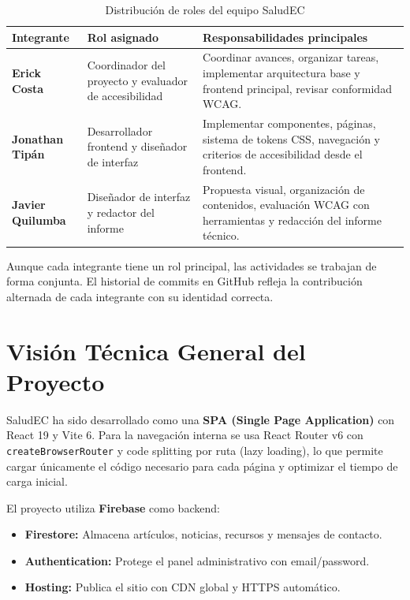 \documentclass[12pt, a4paper]{article}
\begin{document}
\begin{table}[H]
\centering
\caption{Distribución de roles del equipo SaludEC}
\begin{tabular}{@{}>{\bfseries}p{3.5cm} p{4cm} p{6.5cm}@{}}
\toprule
\rowcolor{royalblue!12}
\textbf{Integrante} & \textbf{Rol asignado} & \textbf{Responsabilidades principales} \\
\midrule
Erick Costa &
  Coordinador del proyecto y evaluador de accesibilidad &
  Coordinar avances, organizar tareas, implementar arquitectura base y frontend principal, revisar conformidad WCAG. \\[4pt]
Jonathan Tipán &
  Desarrollador frontend y diseñador de interfaz &
  Implementar componentes, páginas, sistema de tokens CSS, navegación y criterios de accesibilidad desde el frontend. \\[4pt]
Javier Quilumba &
  Diseñador de interfaz y redactor del informe &
  Propuesta visual, organización de contenidos, evaluación WCAG con herramientas y redacción del informe técnico. \\
\bottomrule
\end{tabular}
\end{table}

Aunque cada integrante tiene un rol principal, las actividades se trabajan de forma conjunta. El historial de commits en GitHub refleja la contribución alternada de cada integrante con su identidad correcta.

\section{Visión Técnica General del Proyecto}

SaludEC ha sido desarrollado como una \textbf{SPA (Single Page Application)} con React 19 y Vite 6. Para la navegación interna se usa React Router v6 con \texttt{createBrowserRouter} y code splitting por ruta (lazy loading), lo que permite cargar únicamente el código necesario para cada página y optimizar el tiempo de carga inicial.

El proyecto utiliza \textbf{Firebase} como backend:
\begin{itemize}
  \item \textbf{Firestore:} Almacena artículos, noticias, recursos y mensajes de contacto.
  \item \textbf{Authentication:} Protege el panel administrativo con email/password.
  \item \textbf{Hosting:} Publica el sitio con CDN global y HTTPS automático.
\end{itemize}
\end{document}
